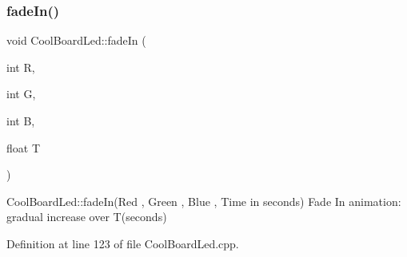 \subsubsection{\texorpdfstring{fade\+In()}{fadeIn()}}
{\footnotesize\ttfamily void Cool\+Board\+Led\+::fade\+In (\begin{DoxyParamCaption}\item[{int}]{R,  }\item[{int}]{G,  }\item[{int}]{B,  }\item[{float}]{T }\end{DoxyParamCaption})}

Cool\+Board\+Led\+::fade\+In(\+Red , Green , Blue , Time in seconds) Fade In animation\+: gradual increase over T(seconds) 

Definition at line 123 of file Cool\+Board\+Led.\+cpp.


